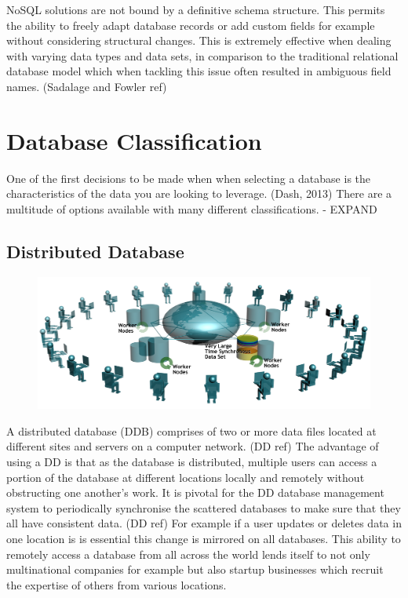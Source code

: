 NoSQL solutions are not bound by a definitive schema structure. This permits the ability to freely adapt database records or add custom fields for example without considering structural changes. This is extremely effective when dealing with varying data types and data sets, in comparison to the traditional relational database model which when tackling this issue often resulted in ambiguous field names. (Sadalage and Fowler ref)

\section{Database Classification}
One of the first decisions to be made when when selecting a database is the characteristics of the data you are looking to leverage. (Dash, 2013) There are a multitude of options available with many different classifications. - EXPAND

\subsection{Distributed Database}\label{distributeddb}
\begin{figure}\includegraphics[width=0.9\linewidth]{images/ddelogo}\end{figure} A distributed database (DDB) comprises of two or more data files located at different sites and servers on a computer network. (DD ref) The advantage of using a DD is that as the database is distributed, multiple users can access a portion of the database at different locations locally and remotely without obstructing one another's work. It is  pivotal for the DD database management system to periodically synchronise the scattered databases to make sure that they all have consistent data. (DD ref) For example if a user updates or deletes data in one location is is essential this change is mirrored on all databases. This ability to remotely access a database from all across the world lends itself to not only multinational companies for example but also startup businesses which recruit the expertise of others from various locations.

